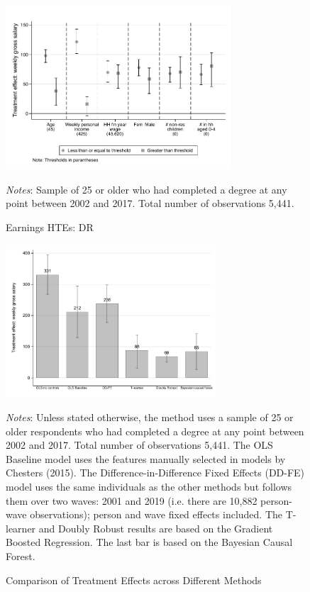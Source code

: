\documentclass[12pt, a4paper]{article}
\begin{document}
\begin{figure}[H]
\centering
\caption{Earnings HTEs: DR}
\vspace{0.5cm}
  \label{fig:htedr}
    \includegraphics[width=0.75\textwidth]{_figures/hte_earnings_GL_100_DR.pdf}
\parbox{1\textwidth}{\footnotesize{\textit{Notes}: Sample of 25 or older who had completed a degree at any point between 2002 and 2017. Total number of observations 5,441.}}
\end{figure}


\begin{figure}[H]
\centering
\caption{Comparison of Treatment Effects across Different Methods}
\vspace{0.5cm}
  \label{fig:method}
    \includegraphics[width=0.7\textwidth]{_figures/method_v2.pdf}
\parbox{1\textwidth}{\footnotesize{\textit{Notes}: Unless stated otherwise, the method uses a sample of 25 or older respondents who had completed a degree at any point between 2002 and 2017. Total number of observations 5,441. The OLS Baseline model uses the features manually selected in models by Chesters (2015). The Difference-in-Difference Fixed Effects (DD-FE) model uses the same individuals as the other methods but follows them over two waves: 2001 and 2019 (i.e. there are 10,882 person-wave observations); person and wave fixed effects included. The T-learner and Doubly Robust results are based on the Gradient Boosted Regression. The last bar is based on the Bayesian Causal Forest.}}
\end{figure}
\end{document}
